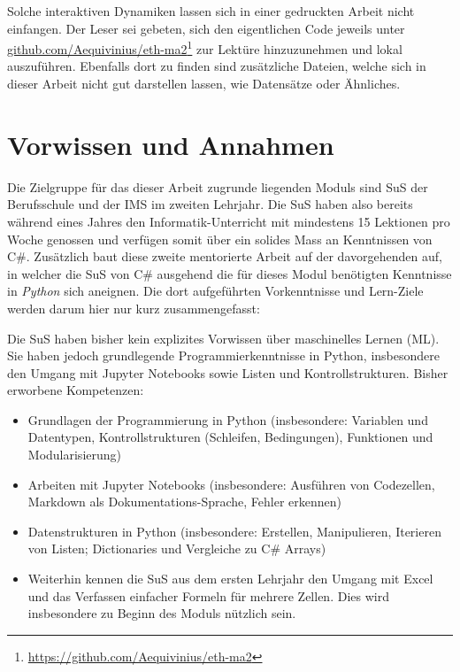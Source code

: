 \documentclass[twocolumn]{article}
\begin{document}
Solche interaktiven Dynamiken lassen sich in einer gedruckten Arbeit nicht einfangen. Der Leser sei gebeten, sich den eigentlichen Code jeweils unter \href{https://github.com/Aequivinius/eth-ma2}{\url{github.com/Aequivinius/eth-ma2}}\footnote{\url{https://github.com/Aequivinius/eth-ma2}} zur Lektüre hinzuzunehmen und lokal auszuführen. Ebenfalls dort zu finden sind zusätzliche Dateien, welche sich in dieser Arbeit nicht gut darstellen lassen, wie Datensätze oder Ähnliches.

\section{Vorwissen und Annahmen}
\label{sec:vorwissen}

Die Zielgruppe für das dieser Arbeit zugrunde liegenden Moduls sind SuS der Berufsschule und der IMS im zweiten Lehrjahr. Die SuS haben also bereits während eines Jahres den Informatik-Unterricht mit mindestens 15 Lektionen pro Woche genossen und verfügen somit über ein solides Mass an Kenntnissen von C\#. Zusätzlich baut diese zweite mentorierte Arbeit auf der davorgehenden auf, in welcher die SuS von C\# ausgehend die für dieses Modul benötigten Kenntnisse in \textit{Python} sich aneignen. Die dort aufgeführten Vorkenntnisse und Lern-Ziele werden darum hier nur kurz zusammengefasst: 

Die SuS haben bisher kein explizites Vorwissen über maschinelles Lernen (ML). Sie haben jedoch grundlegende Programmierkenntnisse in Python, insbesondere den Umgang mit Jupyter Notebooks sowie Listen und Kontrollstrukturen. Bisher erworbene Kompetenzen:

\begin{itemize}[itemsep=0.3em, parsep=0pt, topsep=1em]
\item Grundlagen der Programmierung in Python (insbesondere: Variablen und Datentypen, Kontrollstrukturen (Schleifen, Bedingungen), Funktionen und Modularisierung)

\item Arbeiten mit Jupyter Notebooks (insbesondere: Ausführen von Codezellen, Markdown als Dokumentations-Sprache, Fehler erkennen)

\item Datenstrukturen in Python (insbesondere: Erstellen, Manipulieren, Iterieren von Listen; Dictionaries und Vergleiche zu C\# Arrays)

\item Weiterhin kennen die SuS aus dem ersten Lehrjahr den Umgang mit Excel und das Verfassen einfacher Formeln für mehrere Zellen. Dies wird insbesondere zu Beginn des Moduls nützlich sein.

\end{itemize}
\end{document}
